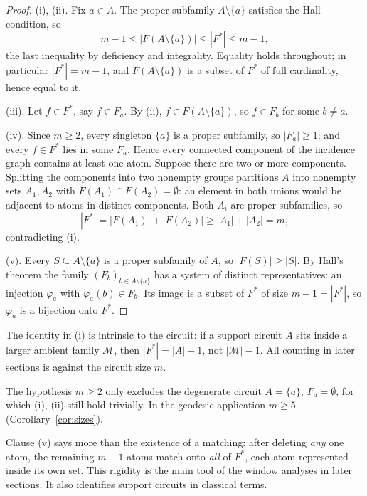 \begin{proof}
(i), (ii). Fix \(a\in A\). The proper subfamily \(A\setminus\{a\}\)
satisfies the Hall condition, so
\[
 m-1\le|F(A\setminus\{a\})|\le|F^{*}|\le m-1,
\]
the last inequality by deficiency and integrality. Equality holds
throughout; in particular \(|F^{*}|=m-1\), and
\(F(A\setminus\{a\})\) is a subset of \(F^{*}\) of full cardinality,
hence equal to it.

(iii). Let \(f\in F^{*}\), say \(f\in F_a\). By (ii),
\(f\in F(A\setminus\{a\})\), so \(f\in F_b\) for some \(b\neq a\).

(iv). Since \(m\ge2\), every singleton \(\{a\}\) is a proper subfamily,
so \(|F_a|\ge1\); and every \(f\in F^{*}\) lies in some \(F_a\). Hence
every connected component of the incidence graph contains at least one
atom. Suppose there are two or more components. Splitting the
components into two nonempty groups partitions \(A\) into nonempty sets
\(A_1,A_2\) with \(F(A_1)\cap F(A_2)=\emptyset\): an element in both
unions would be adjacent to atoms in distinct components. Both \(A_i\)
are proper subfamilies, so
\[
 |F^{*}|=|F(A_1)|+|F(A_2)|\ge|A_1|+|A_2|=m,
\]
contradicting (i).

(v). Every \(S\subseteq A\setminus\{a\}\) is a proper subfamily of
\(A\), so \(|F(S)|\ge|S|\). By Hall's theorem \cite{Hall35} the family
\((F_b)_{b\in A\setminus\{a\}}\) has a system of distinct
representatives: an injection \(\varphi_a\) with
\(\varphi_a(b)\in F_b\). Its image is a subset of \(F^{*}\) of size
\(m-1=|F^{*}|\), so \(\varphi_a\) is a bijection onto \(F^{*}\).
\end{proof}

\begin{remark}\label{rem:intrinsic}
The identity in (i) is intrinsic to the circuit: if a support circuit
\(A\) sits inside a larger ambient family \(\mathcal M\), then
\(|F^{*}|=|A|-1\), not \(|\mathcal M|-1\). All counting in later
sections is against the circuit size \(m\).
\end{remark}

\begin{remark}
The hypothesis \(m\ge2\) only excludes the degenerate circuit
\(A=\{a\}\), \(F_a=\emptyset\), for which (i), (ii) still hold
trivially. In the geodesic application \(m\ge5\)
(Corollary~\ref{cor:sizes}).
\end{remark}

Clause (v) says more than the existence of a matching: after deleting
\emph{any} one atom, the remaining \(m-1\) atoms match onto \emph{all}
of \(F^{*}\), each atom represented inside its own set. This rigidity
is the main tool of the window analyses in later sections. It also
identifies support circuits in classical terms.

